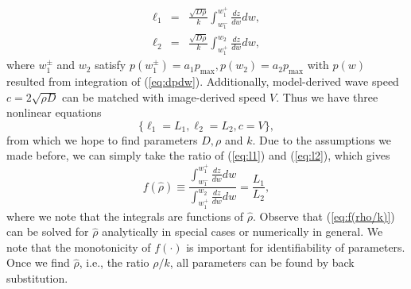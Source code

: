 \documentclass{aims}
\numberwithin{equation}{section}
\begin{document}
\begin{subequations}
\begin{eqnarray}
\ell_{1} & = & \frac{\sqrt{D\rho}}{k}\int_{w_{1}^{-}}^{w_{1}^{+}}\frac{dz}{dw}dw,\label{eq:l1}\\
\ell_{2} & = & \frac{\sqrt{D\rho}}{k}\int_{w_{1}^{+}}^{w_{2}}\frac{dz}{dw}dw,\label{eq:l2}
\end{eqnarray}
\end{subequations}
where $w_{1}^{\pm}$ and $w_{2}$ satisfy $p(w_{1}^{\pm})=a_{1}p_{\text{max}},p(w_{2})=a_{2}p_{\max}$ with $p(w)$ resulted from integration of (\ref{eq:dpdw}). Additionally, model-derived wave
speed $c=2\sqrt{\rho D}$ can be matched with image-derived speed
$V$. Thus we have three nonlinear equations
\begin{equation}
\{\ell_{1}=L_{1},\ell_{2}=L_{2},c=V\},\label{eq:l1l2c}
\end{equation}
from which we hope to find parameters $D,\rho$ and $k$. Due
to the assumptions we made before, we can simply take the ratio of
(\ref{eq:l1}) and (\ref{eq:l2}), which gives
\begin{equation}
f(\hat{\rho})\equiv\frac{\int_{w_{1}^{-}}^{w_{1}^{+}}\frac{dz}{dw}dw}{\int_{w_{1}^{+}}^{w_{2}}\frac{dz}{dw}dw}=\frac{L_{1}}{L_{2}},\label{eq:f(rho/k)}
\end{equation}
where we note that the integrals are functions of $\hat{\rho}$. Observe that (\ref{eq:f(rho/k)})
can be solved for $\hat{\rho}$ analytically in special cases or numerically
in general. We note that the monotonicity of $f(\cdot)$ is important
for identifiability of parameters. Once we find $\hat{\rho}$, i.e., the ratio $\rho /k$, all parameters can be found by back substitution.
\end{document}
